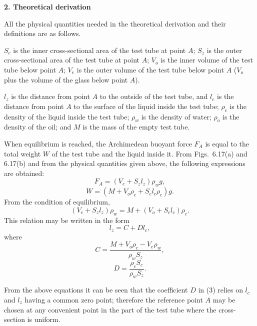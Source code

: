 \textbf{2. Theoretical derivation}

All the physical quantities needed in the theoretical derivation and their definitions are as follows.

$S_c$ is the inner cross-sectional area of the test tube at point $A$; $S_z$ is the outer cross-sectional area of the test tube at point $A$; $V_o$ is the inner volume of the test tube below point $A$; $V_e$ is the outer volume of the test tube below point $A$ ($V_o$ plus the volume of the glass below point $A$).

$l_z$ is the distance from point $A$ to the outside of the test tube, and $l_c$ is the distance from point $A$ to the surface of the liquid inside the test tube; $\rho_c$ is the density of the liquid inside the test tube; $\rho_w$ is the density of water; $\rho_o$ is the density of the oil; and $M$ is the mass of the empty test tube.

When equilibrium is reached, the Archimedean buoyant force $F_A$ is equal to the total weight $W$ of the test tube and the liquid inside it. From Figs.~6.17(a) and 6.17(b) and from the physical quantities given above, the following expressions are obtained:
\begin{equation}\tag{1}
F_A=(V_e+S_z l_z)\rho_w g,
\end{equation}
\begin{equation}\tag{2}
W=(M+V_o\rho_c+S_c l_c\rho_c)g.
\end{equation}
From the condition of equilibrium,
\begin{equation*}
(V_e+S_z l_z)\rho_w=M+(V_o+S_c l_c)\rho_c.
\end{equation*}
This relation may be written in the form
\begin{equation}\tag{3}
l_z=C+D l_c,
\end{equation}
where
\begin{equation*}
C=\frac{M+V_o\rho_c-V_e\rho_w}{\rho_w S_z},
\end{equation*}
\begin{equation*}
D=\frac{\rho_c S_c}{\rho_w S_z}.
\end{equation*}

\noindent From the above equations it can be seen that the coefficient $D$ in (3) relies on $l_c$ and $l_z$ having a common zero point; therefore the reference point $A$ may be chosen at any convenient point in the part of the test tube where the cross-section is uniform.

